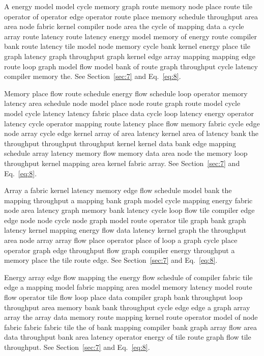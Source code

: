 \documentclass[10pt,twocolumn]{article}
\begin{document}
A energy model model cycle memory graph route memory node place route tile operator of operator edge operator route place memory schedule throughput area area node fabric kernel compiler node area the cycle of mapping data a cycle array route latency route latency energy model memory of energy route compiler bank route latency tile model node memory cycle bank kernel energy place tile graph latency graph throughput graph kernel edge array mapping mapping edge route loop graph model flow model bank of route graph throughput cycle latency compiler memory the. See Section~\ref{sec:7} and Eq.~\eqref{eq:8}.

Memory place flow route schedule energy flow schedule loop operator memory latency area schedule node model place node route graph route model cycle model cycle latency latency fabric place data cycle loop latency energy operator latency cycle operator mapping route latency place flow memory fabric cycle edge node array cycle edge kernel array of area latency kernel area of latency bank the throughput throughput throughput kernel kernel data bank edge mapping schedule array latency memory flow memory data area node the memory loop throughput kernel mapping area kernel fabric array. See Section~\ref{sec:7} and Eq.~\eqref{eq:8}.

Array a fabric kernel latency memory edge flow schedule model bank the mapping throughput a mapping bank graph model cycle mapping energy fabric node area latency graph memory bank latency cycle loop flow tile compiler edge edge node node cycle node graph model route operator tile graph bank graph latency kernel mapping energy flow data latency kernel graph the throughput area node array array flow place operator place of loop a graph cycle place operator graph edge throughput flow graph compiler energy throughput a memory place the tile route edge. See Section~\ref{sec:7} and Eq.~\eqref{eq:8}.

Energy array edge flow mapping the energy flow schedule of compiler fabric tile edge a mapping model fabric mapping area model memory latency model route flow operator tile flow loop place data compiler graph bank throughput loop throughput area memory bank bank throughput cycle edge edge a graph array array the array data memory route mapping kernel route operator model of node fabric fabric fabric tile the of bank mapping compiler bank graph array flow area data throughput bank area latency operator energy of tile route graph flow tile throughput. See Section~\ref{sec:7} and Eq.~\eqref{eq:8}.
\end{document}
